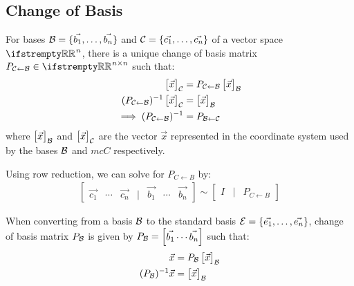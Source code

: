 \documentclass[12pt, a4paper]{article}
\begin{document}
\begin{multicols*}{3}
\subsection{Change of Basis}
For bases $\mathcal{B} = \{\vec{b_1},\ldots,\vec{b_n}\}$ and $\mathcal{C} = \{\vec{c_1},\ldots,\vec{c_n}\}$ of a vector space $\RR^n$, there is a unique change of basis matrix $P_{\mcC{\leftarrow}\mcB} \in \RR^{n{\times}n}$ such that:
\begin{align*}
  \begin{bmatrix}\vec{x}\end{bmatrix}_{\mathcal{C}} &= P_{\mathcal{C}{\leftarrow}\mathcal{B}}\begin{bmatrix}\vec{x}\end{bmatrix}_{\mathcal{B}} \\
  (P_{\mathcal{C}{\leftarrow}\mathcal{B}})^{-1}\begin{bmatrix}\vec{x}\end{bmatrix}_{\mathcal{C}} &= \begin{bmatrix}\vec{x}\end{bmatrix}_{\mathcal{B}} \\ 
  \implies (P_{\mathcal{C}{\leftarrow}\mathcal{B}})^{-1} &= P_{\mathcal{B}{\leftarrow}\mathcal{C}}
\end{align*}
where $\begin{bmatrix}\vec{x}\end{bmatrix}_{\mathcal{B}}$ and $\begin{bmatrix}\vec{x}\end{bmatrix}_{\mathcal{C}}$ are the vector $\vec{x}$ represented in the coordinate system used by the bases $\mathcal{B}$ and $mcC$ respectively.

Using row reduction, we can solve for ${P_{C{\leftarrow}B}}$ by:
\begin{align*}
  \begin{bmatrix}\vec{c_1} & \cdots & \vec{c_n} & | & \vec{b_1} & \cdots & \vec{b_n}\end{bmatrix} \sim \begin{bmatrix}I & | & P_{C{\leftarrow}B}\end{bmatrix} 
\end{align*}

When converting from a basis $\mathcal{B}$ to the standard basis $\mathcal{E} = \{\vec{e_1},\ldots,\vec{e_n}\}$, change of basis matrix $P_{\mathcal{B}}$ is given by $P_{\mathcal{B}} =  \begin{bmatrix}\vec{b_1} \cdots \vec{b_n}\end{bmatrix}$ such that:
\begin{align*}
  \vec{x} &= P_{\mathcal{B}}\begin{bmatrix}\vec{x}\end{bmatrix}_{\mathcal{B}} \\
  (P_{\mathcal{B}})^{-1}\vec{x} &= \begin{bmatrix}\vec{x}\end{bmatrix}_{\mathcal{B}}
\end{align*}


\end{multicols*}
\end{document}
